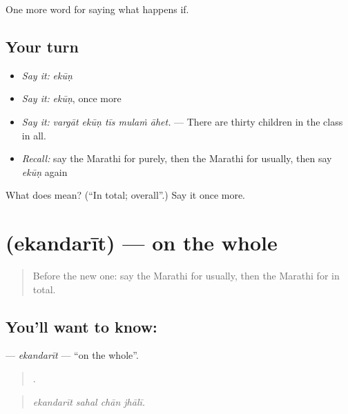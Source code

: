 \begin{grammarlens}[title={What you've built}]
One more word for saying what happens if.
\end{grammarlens}

\subsection*{Your turn}
\begin{itemize}
\raggedright
  \item \emph{Say it:} \emph{ekūṇ}
  \item \emph{Say it:} \emph{ekūṇ}, once more
  \item \emph{Say it:} \emph{vargāt ekūṇ tīs mulaṁ āhet.} — There are thirty children in the class in all.
  \item \emph{Recall:} say the Marathi for purely, then the Marathi for usually, then say \emph{ekūṇ} again
\end{itemize}

\begin{tcolorbox}[breakable,colback=teal!4,colframe=teal!35!black,title={Before you move on}]
What does  mean? (\textquotedblleft{}In total; overall\textquotedblright{}.) Say it once more.
\end{tcolorbox}
\section[\texorpdfstring{\mr{एकंदरीत} (ekandarīt)}{एकंदरीत (ekandarīt)}]{ (ekandarīt) — on the whole}

\label{lesson:MR-C390-ekandarit}



\begin{quote}
Before the new one: say the Marathi for usually, then the Marathi for in total.
\end{quote}

\subsection*{You'll want to know: }
\textbf{} — \emph{ekandarīt} — \textquotedblleft{}on the whole\textquotedblright{}.

\begin{quote}
   .
\end{quote}

\begin{quote}
\emph{ekandarīt sahal chān jhālī.}
\end{quote}

